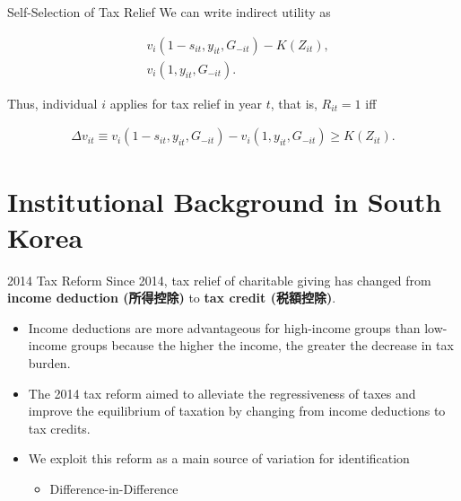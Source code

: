 \documentclass[
  ignorenonframetext,
  aspectratio=169,
]{beamer}
\providecommand{\tightlist}{%
  \setlength{\itemsep}{0pt}\setlength{\parskip}{0pt}}
\begin{document}
\begin{frame}{Self-Selection of Tax Relief}
\protect\hypertarget{self-selection-of-tax-relief}{}
We can write indirect utility as

\begin{align}
  &v_i(1 - s_{it}, y_{it}, G_{-it}) - K(Z_{it}),  \\
  &v_i(1, y_{it}, G_{-it}).
\end{align}

Thus, individual \(i\) applies for tax relief in year \(t\),
that is, \(R_{it} = 1\) iff

\begin{align}
  \Delta v_{it} \equiv
  v_i(1 - s_{it}, y_{it}, G_{-it}) - v_i(1, y_{it}, G_{-it})
  \ge K(Z_{it}).
\end{align}
\end{frame}

\hypertarget{institutional-background-in-south-korea}{%
\section{Institutional Background in South Korea}\label{institutional-background-in-south-korea}}

\begin{frame}{2014 Tax Reform}
\protect\hypertarget{tax-reform}{}
Since 2014, tax relief of charitable giving has changed from \textbf{income deduction (所得控除)} to \textbf{tax credit (税額控除)}.

\begin{itemize}
\tightlist
\item
  Income deductions are more advantageous for high-income groups than low-income groups because the higher the income, the greater the decrease in tax burden.
\item
  The 2014 tax reform aimed to alleviate the regressiveness of taxes and improve the equilibrium of taxation by changing from income deductions to tax credits.
\item
  We exploit this reform as a main source of variation for identification

  \begin{itemize}
  \tightlist
  \item
    Difference-in-Difference
  \end{itemize}
\end{itemize}
\end{frame}
\end{document}
